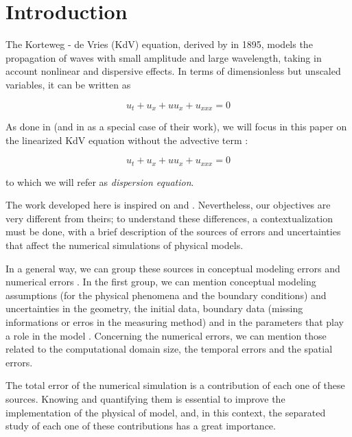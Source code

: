 \section{Introduction}

\indent The Korteweg - de Vries (KdV) equation, derived by \cite{kdv1895} in 1895, models the propagation of waves with small amplitude and large wavelength, taking in account nonlinear and dispersive effects. In terms of dimensionless but unscaled variables, it can be written as \cite{BBM1971}

\begin{equation}
	u_t + u_x + uu_x + u_{xxx} = 0
\end{equation}

\indent As done in \cite{zheng2008} (and in \cite{besse2015} as a special case of their work), we will focus in this paper on the linearized KdV equation without the advective term : 

\begin{equation}
 \label{eq:DKdV}
	u_t + u_x + uu_x + u_{xxx} = 0
\end{equation}

\noindent to which we will refer as \emph{dispersion equation}.

\indent The work developed here is inspired on  \cite{zheng2008} and \cite{besse2015}. Nevertheless, our objectives are very different from theirs; to understand these differences, a contextualization must be done, with a brief description of the sources of errors and uncertainties  that affect the numerical simulations of physical models.

\indent In a general way, we can group these sources in conceptual modeling errors and numerical errors \cite{roache1997}. In the first group, we can mention conceptual modeling assumptions (for the physical phenomena and the boundary conditions) and uncertainties in the geometry, the initial data, boundary data (missing informations or erros in the measuring method) and in the parameters that play a role in the model \cite{roache1997,balagurusamy2008}. Concerning the numerical errors, we can mention those related to the computational domain size, the temporal errors and the spatial errors.  \cite{karniadakis1995,roache1997} 

\indent The total error of the numerical simulation is a contribution of each one of these sources. Knowing and quantifying them is essential to improve the implementation of the physical of model, and, in this context, the separated study of each one of these contributions has a great importance.

